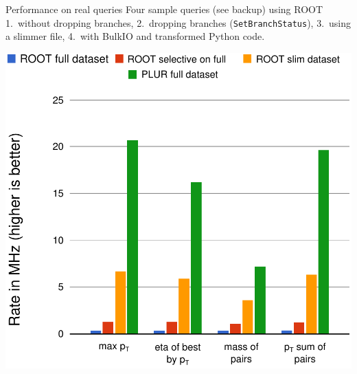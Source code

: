 \documentclass{beamer}
\begin{document}




\begin{frame}{Performance on real queries}
\vspace{0.5 cm}
Four sample queries (see backup) using ROOT \textcolor{results1}{1.~without dropping branches}, \textcolor{results2}{2.~dropping branches ({\tt\small SetBranchStatus})}, \textcolor{results3}{3.~using a slimmer file}, \textcolor{results4}{4.~with BulkIO and transformed Python code}.

\begin{center}
\includegraphics[width=0.65\linewidth]{root-and-plur.pdf}
\end{center}
\end{frame}
\end{document}
